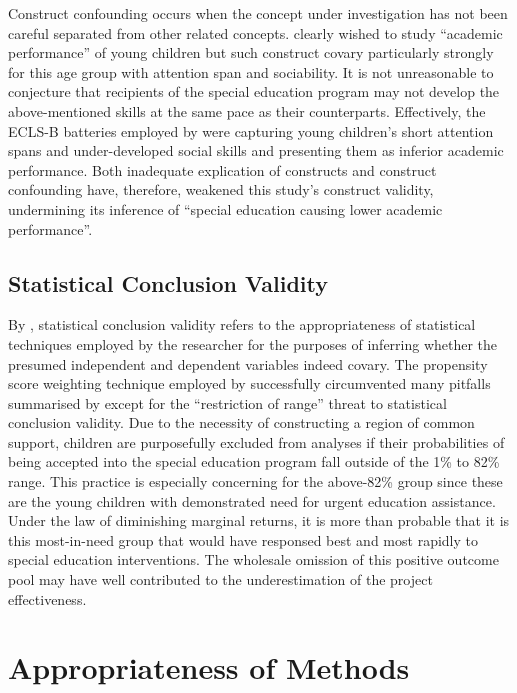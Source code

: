 Construct confounding occurs when the concept under investigation has not been careful separated from other related concepts. \textcite{sullivan:2013} clearly wished to study ``academic performance'' of young children but such construct covary particularly strongly for this age group with attention span and sociability. It is not unreasonable to conjecture that recipients of the special education program may not develop the above-mentioned skills at the same pace as their counterparts. Effectively, the ECLS-B batteries employed by \textcite{sullivan:2013} were capturing young children's short attention spans and under-developed social skills and presenting them as inferior academic performance. Both inadequate explication of constructs and construct confounding have, therefore, weakened this study's construct validity, undermining its inference of ``special education causing lower academic performance''.

\subsection{Statistical Conclusion Validity}

By \textcite{cook:1979}, statistical conclusion validity refers to the appropriateness of statistical techniques employed by the researcher for the purposes of inferring whether the presumed independent and dependent variables indeed covary. The propensity score weighting technique employed by \textcite{sullivan:2013} successfully circumvented many pitfalls summarised by \textcite[][pp. 45--52]{shadish:2002} except for the ``restriction of range'' threat to statistical conclusion validity. Due to the necessity of constructing a region of common support, children are purposefully excluded from analyses if their probabilities of being accepted into the special education program fall outside of the 1\% to 82\% range. This practice is especially concerning for the above-82\% group since these are the young children with demonstrated need for urgent education assistance. Under the law of diminishing marginal returns, it is more than probable that it is this most-in-need group that would have responsed best and most rapidly to special education interventions. The wholesale omission of this positive outcome pool may have well contributed to the underestimation of the project effectiveness.

\section{Appropriateness of Methods}

